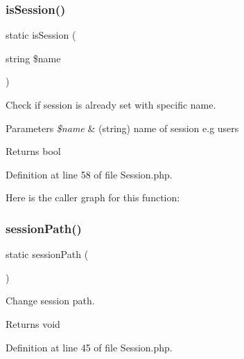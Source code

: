 \subsubsection{\texorpdfstring{is\+Session()}{isSession()}}
{\footnotesize\ttfamily static is\+Session (\begin{DoxyParamCaption}\item[{string}]{\$name }\end{DoxyParamCaption})\hspace{0.3cm}{\ttfamily [static]}}

Check if session is already set with specific name.


\begin{DoxyParams}{Parameters}
{\em \$name} & (string) name of session e.\+g users\\
\hline
\end{DoxyParams}
\begin{DoxyReturn}{Returns}
bool 
\end{DoxyReturn}


Definition at line 58 of file Session.\+php.

Here is the caller graph for this function\+:
\mbox{\label{class_zest_1_1_session_1_1_session_a10b1cecd11adec8f2067f7ed052dbbf0}} 
\subsubsection{\texorpdfstring{session\+Path()}{sessionPath()}}
{\footnotesize\ttfamily static session\+Path (\begin{DoxyParamCaption}{ }\end{DoxyParamCaption})\hspace{0.3cm}{\ttfamily [static]}}

Change session path.

\begin{DoxyReturn}{Returns}
void 
\end{DoxyReturn}


Definition at line 45 of file Session.\+php.

\mbox{\label{class_zest_1_1_session_1_1_session_a5d3c77dc00e3090cbd79986dc2c4d841}} 
